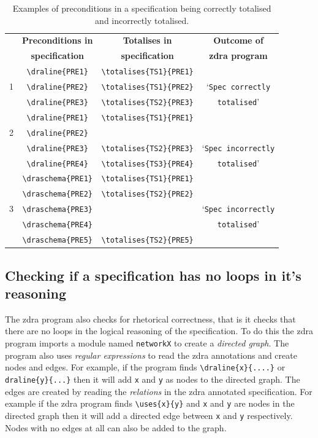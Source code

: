\begin{table}[H]
\begin{tabular}{|c|c|c|c|}
\hline
& \textbf{Preconditions in} & \textbf{Totalises in} & \textbf{Outcome of} \\
& \textbf{specification} & \textbf{specification} & \textbf{\gls{zdra} program}
\\
\hline
\hline
& \verb|\draline{PRE1}| & \verb|\totalises{TS1}{PRE1}| & \\
1 & \verb|\draline{PRE2}| & \verb|\totalises{TS1}{PRE2}| & `\texttt{Spec
correctly} \\
& \verb|\draline{PRE3}| & \verb|\totalises{TS2}{PRE3}|& \texttt{totalised}'\\
\hline
& \verb|\draline{PRE1}| & \verb|\totalises{TS1}{PRE1}| &  \\
2 & \verb|\draline{PRE2}| & & \\
& \verb|\draline{PRE3}| & \verb|\totalises{TS2}{PRE3}|& `\texttt{Spec
incorrectly} \\
& \verb|\draline{PRE4}| & \verb|\totalises{TS3}{PRE4}|& \texttt{totalised}' \\
\hline
& \verb|\draschema{PRE1}| & \verb|\totalises{TS1}{PRE1}| &  \\
 & \verb|\draschema{PRE2}| & \verb|\totalises{TS2}{PRE2}| & \\
3 & \verb|\draschema{PRE3}| & & `\texttt{Spec incorrectly} \\
& \verb|\draschema{PRE4}| &  & \texttt{totalised}' \\
& \verb|\draschema{PRE5}| & \verb|\totalises{TS2}{PRE5}|  & \\
\hline
\end{tabular}
\caption{\label{tab:totalisecorrect} Examples of preconditions in a specification being correctly totalised and incorrectly totalised.}
\end{table}

\subsection{Checking if a specification has no loops in it's reasoning}
\label{subsec:loops}

The \gls{zdra} program also checks for rhetorical correctness, that is it checks
that there are no loops in the logical reasoning of the specification. To do
this the \gls{zdra} program imports a module named \texttt{networkX} to create a
\emph{directed graph}. The program also uses \emph{regular expressions} to read
the \gls{zdra} annotations and create nodes and edges. For example, if the
program finds \verb|\draline{x}{....}| or \verb|draline{y}{...}| then it will
add \texttt{x} and \texttt{y} as nodes to the directed graph. The edges are
created by reading the \emph{relations} in the \gls{zdra} annotated
specification. For example if the \gls{zdra} program finds \verb|\uses{x}{y}|
and \texttt{x} and \texttt{y} are nodes in the directed graph then it will add a
directed edge between \texttt{x} and \texttt{y} respectively. Nodes with no
edges at all can also be added to the graph.

